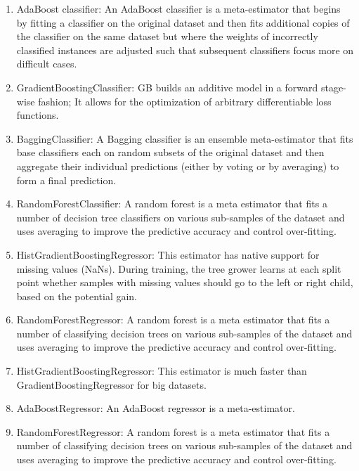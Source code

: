 \documentclass{article}
\begin{document}
	\begin{enumerate}[(1)]
	\item AdaBoost classifier: An AdaBoost classifier is a meta-estimator that begins by fitting a classifier on the original dataset and then fits additional copies of the classifier on the same dataset but where the weights of incorrectly classified instances are adjusted such that subsequent classifiers focus more on difficult cases.
	
	\item GradientBoostingClassifier: GB builds an additive model in a forward stage-wise fashion; It allows for the optimization of arbitrary differentiable loss functions. 

	\item BaggingClassifier: A Bagging classifier is an ensemble meta-estimator that fits base classifiers each on random subsets of the original dataset and then aggregate their individual predictions (either by voting or by averaging) to form a final prediction. 

	\item RandomForestClassifier: A random forest is a meta estimator that fits a number of decision tree classifiers on various sub-samples of the dataset and uses averaging to improve the predictive accuracy and control over-fitting. 

	\item HistGradientBoostingRegressor: This estimator has native support for missing values (NaNs). During training, the tree grower learns at each split point whether samples with missing values should go to the left or right child, based on the potential gain. 

	\item RandomForestRegressor: A random forest is a meta estimator that fits a number of classifying decision trees on various sub-samples of the dataset and uses averaging to improve the predictive accuracy and control over-fitting. 

	\item HistGradientBoostingRegressor: This estimator is much faster than GradientBoostingRegressor for big datasets.

	\item AdaBoostRegressor: An AdaBoost regressor is a meta-estimator.

	\item RandomForestRegressor: A random forest is a meta estimator that fits a number of classifying decision trees on various sub-samples of the dataset and uses averaging to improve the predictive accuracy and control over-fitting.
	\end{enumerate}
\end{document}
